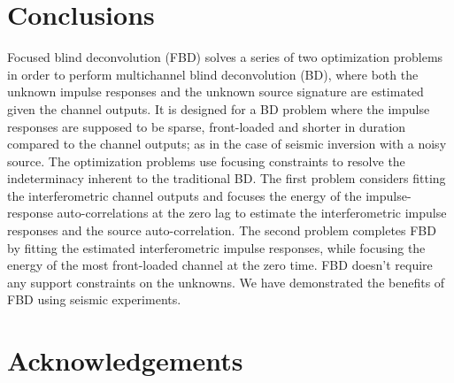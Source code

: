 \documentclass{article}
\theoremstyle{definition}
\def\vecc#1{[#1]}
\begin{document}
{\section{Conclusions}
\label{sec:conc}
Focused blind deconvolution (FBD)
solves a series of 
two optimization problems 
in order to perform
multichannel blind deconvolution (BD), 
where both the unknown impulse responses and the unknown source signature are estimated 
given the channel outputs.
%
It is designed for a BD problem where the impulse responses are 
supposed to be sparse, front-loaded and shorter in duration compared to the channel outputs; 
as in the case of seismic inversion with a noisy source.
%
The optimization problems use focusing constraints to 
resolve the indeterminacy inherent to the traditional BD.
%
The first problem 
considers fitting the interferometric channel outputs and 
focuses the energy of the impulse-response auto-correlations
at the zero lag to estimate the interferometric impulse responses
and the source auto-correlation.
%
The second problem completes FBD by 
fitting the estimated interferometric impulse responses, 
while 
focusing the energy 
of the most front-loaded channel 
at the zero time.
%
FBD doesn't require any support constraints on the unknowns.
%
We have demonstrated the benefits of FBD 
using seismic %
experiments.  
%
%
%


\section{Acknowledgements}

}
\end{document}
